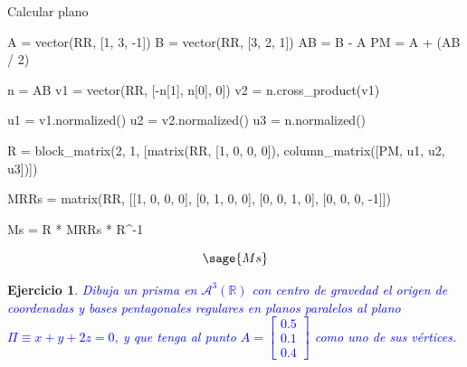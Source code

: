 \documentclass{amsart}
\newtheorem{ejer}{Ejercicio}
\begin{document}

Calcular plano

\begin{sageblock}
A = vector(RR, [1, 3, -1])
B = vector(RR, [3, 2, 1])
AB = B - A
PM = A + (AB / 2)

n = AB
v1 = vector(RR, [-n[1], n[0], 0])
v2 = n.cross_product(v1)


u1 = v1.normalized()
u2 = v2.normalized()
u3 = n.normalized()

R = block_matrix(2, 1, [matrix(RR, [1, 0, 0, 0]), column_matrix([PM, u1, u2, u3])])

MRRs = matrix(RR, [[1, 0, 0, 0], [0, 1, 0, 0], [0, 0, 1, 0], [0, 0, 0, -1]])

Ms = R * MRRs * R^-1
\end{sageblock}

$$
\sage{Ms}
$$

\begin{sagesub}
\begin{center}
\end{center}
\end{sagesub}


\newpage


\begin{ejer}\label{ej:prisma}
\textcolor{blue}{Dibuja un prisma en $\mathcal{A}^3(\mathbb{R})$ con centro de gravedad el origen de coordenadas y bases pentagonales regulares en planos paralelos al plano $\Pi \equiv x+y+2z=0$, y que tenga al punto $A=\left[\begin{array}{c}0.5\\0.1\\0.4\end{array}\right]$ como uno de sus v\'ertices.} 
\end{ejer}
\end{document}
